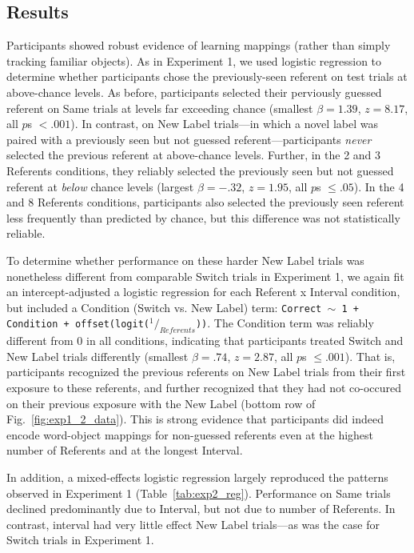 \documentclass[authoryear,review]{elsarticle}
\begin{document}
\subsection{Results}

Participants showed robust evidence of learning mappings (rather than simply tracking familiar objects). As in Experiment 1, we used logistic regression to determine whether participants chose the previously-seen referent on test trials at above-chance levels. As before, participants selected their perviously guessed referent on Same trials at levels far exceeding chance (smallest $\beta =  1.39$, $z=8.17$, all $p$s $< .001$). In contrast, on New Label trials---in which a novel label was paired with a previously seen but not guessed referent---participants \emph{never} selected the previous referent at above-chance levels. Further, in the 2 and 3 Referents conditions, they reliably selected the previously seen but not guessed referent at \emph{below} chance levels (largest $\beta =  -.32$, $z=1.95$, all $p$s $\leq .05$). In the 4 and 8 Referents conditions, participants also selected the previously seen referent less frequently than predicted by chance, but this difference was not statistically reliable.

To determine whether performance on these harder New Label trials was nonetheless different from comparable Switch trials in Experiment 1, we again fit an intercept-adjusted a logistic regression for each Referent x Interval condition, but included a Condition (Switch vs. New Label) term: {\small \tt{Correct $\sim$ 1 + Condition + offset(logit($^1/_{Referents}$))}}. The Condition term was reliably different from 0 in all conditions, indicating that participants treated Switch and New Label trials differently (smallest $\beta =  .74$, $z=2.87$, all $p$s $\leq .001$). That is, participants recognized the previous referents on New Label trials from their first exposure to these referents, and further recognized that they had not co-occured on their previous exposure with the New Label (bottom row of Fig.~\ref{fig:exp1_2_data}). This is strong evidence that participants did indeed encode word-object mappings for non-guessed referents even at the highest number of Referents and at the longest Interval.

In addition, a mixed-effects logistic regression largely reproduced the patterns observed in Experiment 1 (Table~\ref{tab:exp2_reg}). Performance on Same trials declined predominantly due to Interval, but not due to number of Referents. In contrast, interval had very little effect New Label trials---as was the case for Switch trials in Experiment 1.
\end{document}
